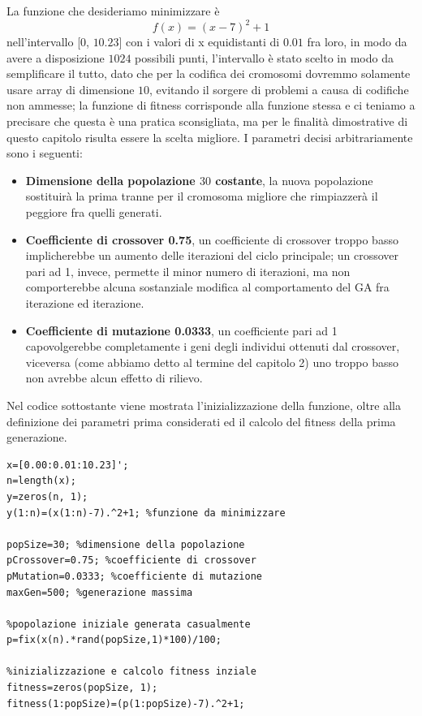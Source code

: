 La funzione che desideriamo minimizzare \`e $$f(x)=(x-7)^2+1$$ nell'intervallo [$0$, $10.23$] con i valori di x equidistanti di $0.01$ fra loro, in modo da avere a disposizione $1024$ possibili punti, l'intervallo \`e stato scelto in modo da semplificare il tutto, dato che per la codifica dei cromosomi dovremmo solamente usare array di dimensione $10$, evitando il sorgere di problemi a causa di codifiche non ammesse; la funzione di fitness corrisponde alla funzione stessa e ci teniamo a precisare che questa \`e una pratica sconsigliata, ma per le finalit\`a dimostrative di questo capitolo risulta essere la scelta migliore. 
I parametri decisi arbitrariamente sono i seguenti:
\begin{itemize}
    \item \textbf{Dimensione della popolazione $30$ costante}, la nuova popolazione sostituir\`a la prima tranne per il cromosoma migliore che rimpiazzer\`a il peggiore fra quelli generati.
    \item\textbf{Coefficiente di crossover 0.75}, un coefficiente di crossover troppo basso implicherebbe un aumento delle iterazioni del ciclo principale; un crossover pari ad 1, invece, permette il minor numero di iterazioni, ma non comporterebbe alcuna sostanziale modifica al comportamento del GA fra iterazione ed iterazione.
    \item \textbf{Coefficiente di mutazione 0.0333}, un coefficiente pari ad 1 capovolgerebbe completamente i geni degli individui ottenuti dal crossover, viceversa (come abbiamo detto al termine del capitolo 2) uno troppo basso non avrebbe alcun effetto di rilievo. 
\end{itemize}
Nel codice sottostante viene mostrata l'inizializzazione della funzione, oltre alla definizione dei parametri prima considerati ed il calcolo del fitness della prima generazione.
\begin{lstlisting}[style=matlab, style=matlab2, style=matlab3]
x=[0.00:0.01:10.23]';
n=length(x);
y=zeros(n, 1);
y(1:n)=(x(1:n)-7).^2+1; %funzione da minimizzare

popSize=30; %dimensione della popolazione
pCrossover=0.75; %coefficiente di crossover
pMutation=0.0333; %coefficiente di mutazione
maxGen=500; %generazione massima

%popolazione iniziale generata casualmente
p=fix(x(n).*rand(popSize,1)*100)/100;

%inizializzazione e calcolo fitness inziale
fitness=zeros(popSize, 1);
fitness(1:popSize)=(p(1:popSize)-7).^2+1;
\end{lstlisting}
